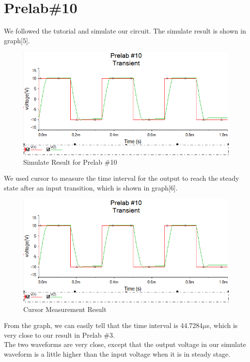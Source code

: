 \documentclass{IEEEtran}
\begin{document}
	\section{\textbf{Prelab\#10}}
	We followed the tutorial and simulate our circuit. The simulate result is shown in graph[5].
	\begin{figure}[!htbp]
		\centering
		\label{fig:1001}
		\begin{framed}
			\includegraphics[width=\linewidth]{images/10_1.PNG}
			\caption{Simulate Result for Prelab \#10}
		\end{framed}
	\end{figure}
	We used cursor to measure the time interval for the output to reach the steady state after an input transition, which is shown in graph[6].
	\begin{figure}[!htbp]
		\centering
		\label{fig:1002}
		\begin{framed}
			\includegraphics[width=\linewidth]{images/10_1.PNG}
			\caption{Cursor Measurement Result}
		\end{framed}
	\end{figure}
	From the graph, we can easily tell that the time interval is 44.7284$\mu$s, which is very close to our result in Prelab \#3.\\
	The two waveforms are very close, except that the output voltage in our simulate waveform is a little higher than the input voltage when it is in steady stage.\\
\end{document}
